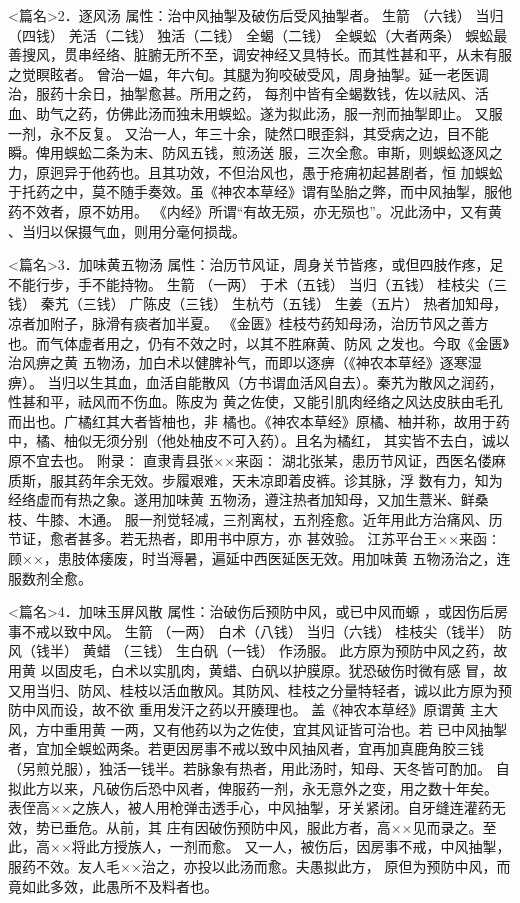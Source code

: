 \documentclass[a4paper,12pt,UTF8,twoside]{ctexbook}
\begin{document}
<篇名>2．逐风汤
属性：治中风抽掣及破伤后受风抽掣者。 
生箭 （六钱） 当归（四钱） 羌活（二钱） 独活（二钱） 
全蝎（二钱） 全蜈蚣（大者两条） 
蜈蚣最善搜风，贯串经络、脏腑无所不至，调安神经又具特长。而其性甚和平，从未有服之觉瞑眩者。 
曾治一媪，年六旬。其腿为狗咬破受风，周身抽掣。延一老医调治，服药十余日，抽掣愈甚。所用之药， 
每剂中皆有全蝎数钱，佐以祛风、活血、助气之药，仿佛此汤而独未用蜈蚣。遂为拟此汤，服一剂而抽掣即止。 
又服一剂，永不反复。 
又治一人，年三十余，陡然口眼歪斜，其受病之边，目不能瞬。俾用蜈蚣二条为末、防风五钱，煎汤送 
服，三次全愈。审斯，则蜈蚣逐风之力，原迥异于他药也。且其功效，不但治风也，愚于疮痈初起甚剧者，恒 
加蜈蚣于托药之中，莫不随手奏效。虽《神农本草经》谓有坠胎之弊，而中风抽掣，服他药不效者，原不妨用。 
《内经》所谓“有故无殒，亦无殒也”。况此汤中，又有黄 、当归以保摄气血，则用分毫何损哉。 


<篇名>3．加味黄五物汤
属性：治历节风证，周身关节皆疼，或但四肢作疼，足不能行步，手不能持物。 
生箭 （一两） 于术（五钱） 当归（五钱） 桂枝尖（三钱） 秦艽（三钱） 广陈皮（三钱） 
生杭芍（五钱） 生姜（五片） 
热者加知母，凉者加附子，脉滑有痰者加半夏。 
《金匮》桂枝芍药知母汤，治历节风之善方也。而气体虚者用之，仍有不效之时，以其不胜麻黄、防风 
之发也。今取《金匮》治风痹之黄 五物汤，加白术以健脾补气，而即以逐痹（《神农本草经》逐寒湿痹）。 
当归以生其血，血活自能散风（方书谓血活风自去）。秦艽为散风之润药，性甚和平，祛风而不伤血。陈皮为 
黄之佐使，又能引肌肉经络之风达皮肤由毛孔而出也。广橘红其大者皆柚也，非 
橘也。《神农本草经》原橘、柚并称，故用于药中，橘、柚似无须分别（他处柚皮不可入药）。且名为橘红， 
其实皆不去白，诚以原不宜去也。 
附录∶ 
直隶青县张××来函∶ 
湖北张某，患历节风证，西医名偻麻质斯，服其药年余无效。步履艰难，天未凉即着皮裤。诊其脉，浮 
数有力，知为经络虚而有热之象。遂用加味黄 五物汤，遵注热者加知母，又加生薏米、鲜桑枝、牛膝、木通。 
服一剂觉轻减，三剂离杖，五剂痊愈。近年用此方治痛风、历节证，愈者甚多。若无热者，即用书中原方，亦 
甚效验。 
江苏平台王××来函∶ 
顾××，患肢体痿废，时当溽暑，遍延中西医延医无效。用加味黄 五物汤治之，连服数剂全愈。 


<篇名>4．加味玉屏风散
属性：治破伤后预防中风，或已中风而螈 ，或因伤后房事不戒以致中风。 
生箭 （一两） 白术（八钱） 当归（六钱） 桂枝尖（钱半） 防风（钱半） 黄蜡 
（三钱） 生白矾（一钱） 作汤服。 
此方原为预防中风之药，故用黄 以固皮毛，白术以实肌肉，黄蜡、白矾以护膜原。犹恐破伤时微有感 
冒，故又用当归、防风、桂枝以活血散风。其防风、桂枝之分量特轻者，诚以此方原为预防中风而设，故不欲 
重用发汗之药以开腠理也。 
盖《神农本草经》原谓黄 主大风，方中重用黄 一两，又有他药以为之佐使，宜其风证皆可治也。若 
已中风抽掣者，宜加全蜈蚣两条。若更因房事不戒以致中风抽风者，宜再加真鹿角胶三钱 
（另煎兑服），独活一钱半。若脉象有热者，用此汤时，知母、天冬皆可酌加。 
自拟此方以来，凡破伤后恐中风者，俾服药一剂，永无意外之变，用之数十年矣。 
表侄高××之族人，被人用枪弹击透手心，中风抽掣，牙关紧闭。自牙缝连灌药无效，势已垂危。从前，其 
庄有因破伤预防中风，服此方者，高××见而录之。至此，高××将此方授族人，一剂而愈。 
又一人，被伤后，因房事不戒，中风抽掣，服药不效。友人毛××治之，亦投以此汤而愈。夫愚拟此方， 
原但为预防中风，而竟如此多效，此愚所不及料者也。 
\end{document}
